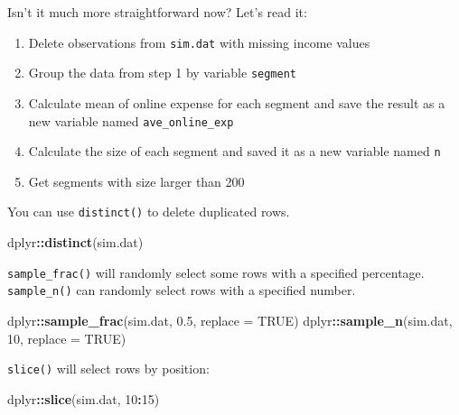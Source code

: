 \documentclass[12pt,]{krantz}
\makeatletter
\newenvironment{Shaded}{\begin{snugshade}}{\end{snugshade}}
\newcommand{\DataTypeTok}[1]{\textcolor[rgb]{0.27,0.27,0.27}{#1}}
\newcommand{\DecValTok}[1]{\textcolor[rgb]{0.06,0.06,0.06}{#1}}
\newcommand{\FloatTok}[1]{\textcolor[rgb]{0.06,0.06,0.06}{#1}}
\newcommand{\KeywordTok}[1]{\textcolor[rgb]{0.27,0.27,0.27}{\textbf{#1}}}
\newcommand{\NormalTok}[1]{#1}
\newcommand{\OperatorTok}[1]{\textcolor[rgb]{0.43,0.43,0.43}{\textbf{#1}}}
\newcommand{\OtherTok}[1]{\textcolor[rgb]{0.37,0.37,0.37}{#1}}
\providecommand{\tightlist}{%
  \setlength{\itemsep}{0pt}\setlength{\parskip}{0pt}}
\newenvironment{kframe}{%
\medskip{}
\setlength{\fboxsep}{.8em}
 \def\at@end@of@kframe{}%
 \ifinner\ifhmode%
  \def\at@end@of@kframe{\end{minipage}}%
  \begin{minipage}{\columnwidth}%
 \fi\fi%
 \def\FrameCommand##1{\hskip\@totalleftmargin \hskip-\fboxsep
 \colorbox{shadecolor}{##1}\hskip-\fboxsep
     \hskip-\linewidth \hskip-\@totalleftmargin \hskip\columnwidth}%
 \MakeFramed {\advance\hsize-\width
   \@totalleftmargin\z@ \linewidth\hsize
   \@setminipage}}%
 {\par\unskip\endMakeFramed%
 \at@end@of@kframe}
\renewenvironment{Shaded}{\begin{kframe}}{\end{kframe}}
\makeatother
\begin{document}
Isn't it much more straightforward now? Let's read it:

\begin{enumerate}
\def\labelenumi{\arabic{enumi}.}
\tightlist
\item
  Delete observations from \texttt{sim.dat} with missing income values
\item
  Group the data from step 1 by variable \texttt{segment}
\item
  Calculate mean of online expense for each segment and save the result as a new variable named \texttt{ave\_online\_exp}
\item
  Calculate the size of each segment and saved it as a new variable named \texttt{n}
\item
  Get segments with size larger than 200
\end{enumerate}

You can use \texttt{distinct()} to delete duplicated rows.

\begin{Shaded}
\begin{Highlighting}[]
\NormalTok{dplyr}\OperatorTok{::}\KeywordTok{distinct}\NormalTok{(sim.dat)}
\end{Highlighting}
\end{Shaded}

\texttt{sample\_frac()} will randomly select some rows with a specified percentage. \texttt{sample\_n()} can randomly select rows with a specified number.

\begin{Shaded}
\begin{Highlighting}[]
\NormalTok{dplyr}\OperatorTok{::}\KeywordTok{sample_frac}\NormalTok{(sim.dat, }\FloatTok{0.5}\NormalTok{, }\DataTypeTok{replace =} \OtherTok{TRUE}\NormalTok{) }
\NormalTok{dplyr}\OperatorTok{::}\KeywordTok{sample_n}\NormalTok{(sim.dat, }\DecValTok{10}\NormalTok{, }\DataTypeTok{replace =} \OtherTok{TRUE}\NormalTok{) }
\end{Highlighting}
\end{Shaded}

\texttt{slice()} will select rows by position:

\begin{Shaded}
\begin{Highlighting}[]
\NormalTok{dplyr}\OperatorTok{::}\KeywordTok{slice}\NormalTok{(sim.dat, }\DecValTok{10}\OperatorTok{:}\DecValTok{15}\NormalTok{) }
\end{Highlighting}
\end{Shaded}
\end{document}
